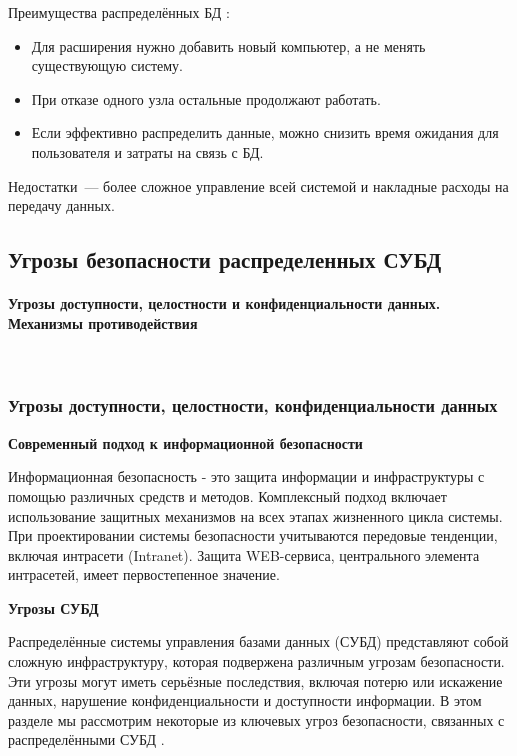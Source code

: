 Преимущества распределённых БД \autocite{DDBMSIndusEdition}:
\begin{itemize}
    \item Для расширения нужно добавить новый компьютер, а не менять существующую систему.
    \item При отказе одного узла остальные продолжают работать.
    \item Если эффективно распределить данные, можно снизить время ожидания для пользователя и затраты на связь с БД.
\end{itemize}

Недостатки~--- более сложное управление всей системой и накладные расходы на передачу данных.


\subsection{Угрозы безопасности распределенных СУБД}
\paragraph{Угрозы доступности, целостности и конфиденциальности данных. Механизмы противодействия} ~\\

\subsubsection{Угрозы доступности, целостности, конфиденциальности данных}
\textbf{Современный подход к информационной безопасности}

Информационная безопасность - это защита информации и инфраструктуры с помощью различных средств и методов. Комплексный подход включает использование защитных механизмов на всех этапах жизненного цикла системы. При проектировании системы безопасности учитываются передовые тенденции, включая интрасети (Intranet). Защита WEB-сервиса, центрального элемента интрасетей, имеет первостепенное значение.

\bigbreak
\textbf{Угрозы СУБД}

Распределённые системы управления базами данных (СУБД) представляют собой сложную инфраструктуру, которая подвержена различным угрозам безопасности. Эти угрозы могут иметь серьёзные последствия, включая потерю или искажение данных, нарушение конфиденциальности и доступности информации. В этом разделе мы рассмотрим некоторые из ключевых угроз безопасности, связанных с распределёнными СУБД \autocite{DistrDBThreats}.

